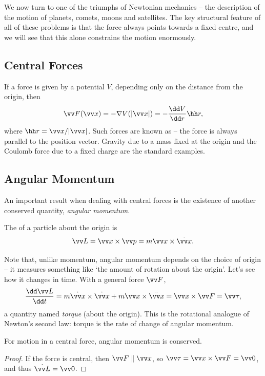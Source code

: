 We now turn to one of the triumphs of Newtonian mechanics -- the description of the motion of planets, comets, moons and satellites. The key structural feature of all of these problems is that the force always points towards a fixed centre, and we will see that this alone constrains the motion enormously.

\subsection{Central Forces}

If a force is given by a potential $V$, depending only on the distance from the origin, then
$$
\vv F(\vv x) = - \nabla V(|\vv x|) = - \frac{\dd V}{\dd r} \hh r,
$$
where $\hh r = \vv x/|\vv x|$. Such forces are known as  -- the force is always parallel to the position vector. Gravity due to a mass fixed at the origin and the Coulomb force due to a fixed charge are the standard examples.

\subsection{Angular Momentum}

An important result when dealing with central forces is the existence of another conserved quantity, \emph{angular momentum}.

\begin{definition}
	The  of a particle about the origin is
	$$
	\vv L = \vv x \times \vv p = m \vv x \times \dot{\vv x}.
	$$
\end{definition}

Note that, unlike momentum, angular momentum depends on the choice of origin -- it measures something like `the amount of rotation about the origin'. Let's see how it changes in time. With a general force $\vv F$,
$$
\frac{\dd \vv L}{\dd t} = m\dot{\vv x} \times \dot{\vv x} + m \vv x \times \ddot{\vv x} = \vv x \times \vv F = \vv \tau,
$$
a quantity named \emph{torque} (about the origin). This is the rotational analogue of Newton's second law: torque is the rate of change of angular momentum.

\begin{proposition}
	For motion in a central force, angular momentum is conserved.
\end{proposition}
\begin{proof}
	If the force is central, then $\vv F \parallel \vv x$, so $\vv \tau = \vv x \times \vv F = \vv 0$, and thus $\dot{\vv L} = \vv 0$.
\end{proof}

